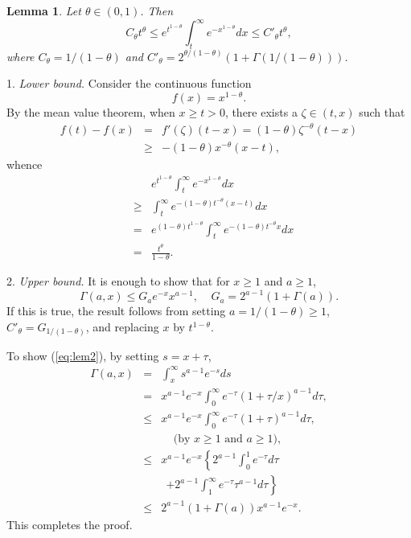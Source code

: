 \documentclass[twoside,twocolumn,journal]{IEEEtran}
\newtheorem{lem}[thm]{Lemma}
\newenvironment{pf}[1][Proof]{\medskip\noindent\hspace{1em}{\itshape #1: }}{\hspace*{\fill}~\QED\par\endtrivlist\medskip}
\begin{document}
\begin{lem} \label{lem:key2} Let $\theta \in (0,1)$. Then
\[ C_\theta t^\theta \leq e^{t^{1-\theta}} \int_t^\infty e^{-x^{1-\theta}} d x \leq C'_\theta t^{\theta}, \]
where $C_\theta = 1/(1-\theta)$ and $C'_\theta = 2^{\theta/(1-\theta)} (1+\Gamma(1/(1-\theta)))$.
\end{lem}

\begin{pf} 1. \emph{Lower bound.} Consider the continuous function
\[ f(x) = x^{1-\theta}. \]
By the mean value theorem, when $x\geq t> 0$, there exists a $\zeta\in (t,x)$ such that
\begin{eqnarray*}
 f(t)-f(x) & = & f'(\zeta) (t-x) = (1-\theta)\zeta^{-\theta}(t-x) \\
 & \geq & -(1-\theta) x^{-\theta} (x-t),
\end{eqnarray*}
whence
\begin{eqnarray*}
& & e^{t^{1-\theta}} \int_t^\infty e^{- x^{1-\theta}} dx  \\
& \geq & \int_t^\infty e^{-(1-\theta) t^{-\theta} (x-t)}dx  \\
& = & e^{(1-\theta) t^{1-\theta}} \int_t^\infty e^{-(1-\theta) t^{-\theta} x}d x \\
& = & \frac{t^\theta}{1-\theta} .
\end{eqnarray*}

2. \emph{Upper bound.} It is enough to show that for $x\geq 1$ and
$a\geq 1$,
\begin{equation} \label{eq:lem2}
\Gamma(a,x) \leq  G_a e^{-x} x^{a-1}, \ \ \ \ \
G_a=2^{a-1}(1+\Gamma(a)).
\end{equation}
If this is true, the result follows from setting $a=1/(1-\theta)\geq 1$, $C'_\theta=G_{1/(1-\theta)}$, and replacing $x$ by $t^{1-\theta}$.

To show (\ref{eq:lem2}), by setting $s=x+\tau$,
\begin{eqnarray*}
\Gamma(a,x) & = & \int_x^\infty s^{a-1} e^{-s} d s  \\
& = &  x^{a-1}e^{-x} \int_0^\infty e^{-\tau} (1+\tau/x)^{a-1} d \tau, \\
& \leq & x^{a-1} e^{-x} \int_0^\infty e^{-\tau} (1+\tau)^{a-1} d \tau, \\
& & \ \ \ \ \ \mbox{(by $x\geq 1$ and $a\geq 1$),} \\
& \leq & x^{a-1} e^{-x} \left\{ 2^{a-1} \int_0^1 e^{-\tau}d\tau \right. \\
& & \ \ \left.+ 2^{a-1} \int_1^\infty e^{-\tau} \tau^{a-1} d \tau \right \} \\
& \leq & 2^{a-1}(1+\Gamma(a)) x^{a-1} e^{-x}.
\end{eqnarray*}
This completes the proof.
\end{pf}
\end{document}
